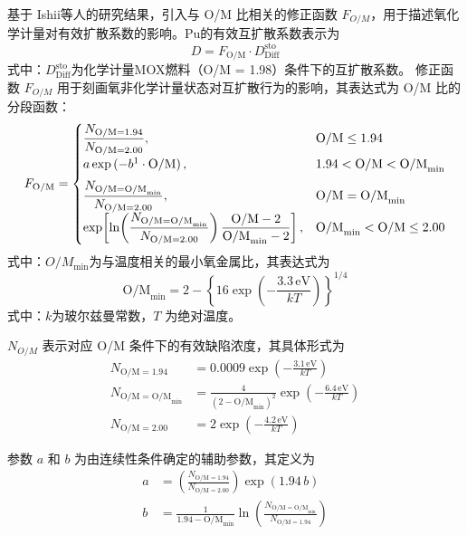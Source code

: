 基于 Ishii\cite{ishiiInvestigationPuMigration2001}等人的研究结果，引入与 O/M 比相关的修正函数 $F_{O/M}$，用于描述氧化学计量对有效扩散系数的影响。Pu的有效互扩散系数表示为
\begin{equation}
	D = F_{\mathrm{O/M}} \cdot D^{\mathrm{sto}}_{\mathrm{Diff}}
\end{equation}
式中：$D^{\mathrm{sto}}_{\mathrm{Diff}}$为化学计量MOX燃料（O/M = 1.98）条件下的互扩散系数。
修正函数 $F_{O/M}$ 用于刻画氧非化学计量状态对互扩散行为的影响，其表达式为 O/M 比的分段函数：
\begin{equation}
	F_{\mathrm{O/M}} =
	\begin{cases}
		\dfrac{N_{\mathrm{O/M}=1.94}}{N_{\mathrm{O/M}=2.00}}, & \mathrm{O/M} \leq 1.94 \\[6pt]
		a \exp\left(-{b}\footnotemark\cdot{\mathrm{O/M}}\right), & 1.94 < \mathrm{O/M} < \mathrm{O/M}_{\min} \\[6pt]
		\dfrac{N_{\mathrm{O/M}=\mathrm{O/M}_{\min}}}{N_{\mathrm{O/M}=2.00}}, & \mathrm{O/M} = \mathrm{O/M}_{\min} \\[6pt]
		\exp\!\left[
		\ln\!\left(\dfrac{N_{\mathrm{O/M}=\mathrm{O/M}_{\min}}}{N_{\mathrm{O/M}=2.00}}\right)
		\dfrac{\mathrm{O/M} - 2}{\mathrm{O/M}_{\min} - 2}
		\right], & \mathrm{O/M}_{\min} < \mathrm{O/M} \leq 2.00
	\end{cases}
\end{equation}
式中：$O/M_{\min}$为与温度相关的最小氧金属比，其表达式为
\begin{equation}
	\mathrm{O/M}_{\min} = 2 - \left\{16 \exp\left(-\frac{3.3\,\mathrm{eV}}{kT}\right)\right\}^{1/4}
\end{equation}
式中：$k$为玻尔兹曼常数，$T$ 为绝对温度。

$N_{O/M}$ 表示对应 O/M 条件下的有效缺陷浓度，其具体形式为
\begin{align}
	N_{\mathrm{O/M}=1.94} &= 0.0009 \exp\left(-\frac{3.1\,\mathrm{eV}}{kT}\right) \\
	N_{\mathrm{O/M}=\mathrm{O/M}_{\min}} &= \frac{4}{(2 - \mathrm{O/M}_{\min})^{2}} \exp\left(-\frac{6.4\,\mathrm{eV}}{kT}\right) \\
	N_{\mathrm{O/M}=2.00} &= 2 \exp\left(-\frac{4.2\,\mathrm{eV}}{kT}\right)
\end{align}

参数 $a$ 和 $b$ 为由连续性条件确定的辅助参数，其定义为
\begin{align}
	a &= \left(\frac{N_{\mathrm{O/M}=1.94}}{N_{\mathrm{O/M}=2.00}}\right)\exp(1.94\,b) \\
	b &= \frac{1}{1.94 - \mathrm{O/M}_{\min}}
	\ln\left(\frac{N_{\mathrm{O/M}=\mathrm{O/M}_{\min}}}{N_{\mathrm{O/M}=1.94}}\right)
\end{align}

